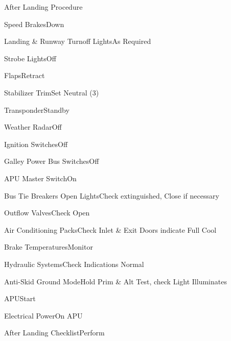 \documentclass[sim-use, blue_items]{checklist}
\begin{document}
\begin{checklist}{After Landing Procedure}
	\item{Speed Brakes}{Down}
	\item{Landing \& Runway Turnoff Lights}{As Required}
	\item{Strobe Lights}{Off}
	\item{Flaps}{Retract}
	\item{Stabilizer Trim}{Set Neutral (3)}
	\item{Transponder}{Standby}
	\item{Weather Radar}{Off}
	\item{Ignition Switches}{Off}
	\item{Galley Power Bus Switches}{Off}
	\item{APU Master Switch}{On}
	\item{Bus Tie Breakers Open Lights}{Check extinguished, Close if necessary}
	\item{Outflow Valves}{Check Open}
	\item{Air Conditioning Packs}{Check Inlet \& Exit Doors indicate Full Cool}
	\item{Brake Temperatures}{Monitor}
	\item{Hydraulic Systems}{Check Indications Normal}
	\item{Anti-Skid Ground Mode}{Hold Prim \& Alt Test, check Light Illuminates}
	\item{APU}{Start}
	\item{Electrical Power}{On APU}
	\item{After Landing Checklist}{Perform}
\end{checklist}
\end{document}
